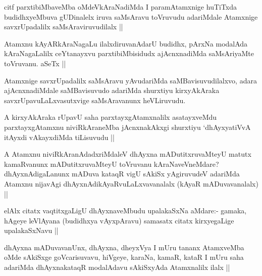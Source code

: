 \begin{artha}
citf parxtibiMbaveMba oMdeVkAraNadiMda I paramAtamxnige huTiTxda budidhxyeMbuva gUDinalelx iruva saMsAravu toVruvudu adariMdale Atamxnige savxrUpadalilx saMsAraviruvudilalx ||
\end{artha}

\begin{artha}
Atamxnu kAyARkAraNagaLu ilalxdiruvanAdarU budidhx, pArxNa modalAda kAraNagaLalilx ceYtanayxvu parxtibiMbisidudx ajAcnxnadiMda saMsAriyaMte toVruvanu. aSeTx ||
\end{artha}

\begin{artha}
Atamxnige savxrUpadalilx saMsAravu yAvudariMda saMBavisuvudilalxvo, adara ajAcnxnadiMdale saMBavisuvudo adariMda shurxtiyu kirxyAkAraka savxrUpavuLaLxvasutxvige saMsAravanunx heVLiruvudu.
\end{artha}

\begin{artha}
A kirxyAkAraka rUpavU saha parxtayxgAtamxnalilx asatayxveMdu parxtayxgAtamxnu niviRkAraneMba jAcnxnakAkxgi shurxtiyu `dhAyxyatiVvA itAyxdi vAkayxdiMda tiLisuvudu ||
\end{artha}

\begin{artha}
A Atamxnu niviRkAranAdadxriMdaleV dhAyxna mADutitxruvaMteyU matutx kamaRvanunx mADutitxruvaMteyU toVruvanu kAraNaveVneMdare? dhAyxnAdigaLanunx mADuva kataqR vigU sAkiSx yAgiruvudeV adariMda Atamxnu nijavAgi dhAyxnAdikAyaRvuLaLxvavanalalx (kAyaR mADuvavanalalx) ||
\end{artha}

\begin{artha}
elAlx citatx vaqtitxgaLigU dhAyxnaveMbudu upalakaSxNa aMdare:- gamaka, hAgeye leVlAyana (budidhxya vAyxpAravu) samasatx citatx kirxyegaLige upalakaSxNavu ||
\end{artha}

\begin{artha}
dhAyxna mADuvavanUnx, dhAyxna, dheyxVya I mUru tananx AtamxveMba oMde sAkiSxge goVcarisuvavu, hiVgeye, karaNa, kamaR, kataR I mUru saha adariMda dhAyxnakataqR modalAdavu sAkiSxyAda Atamxnalilx ilalx ||
\end{artha}

